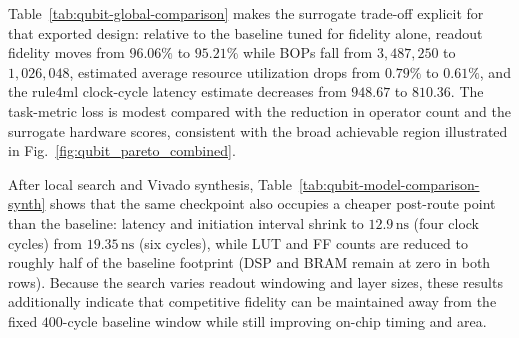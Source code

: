 \documentclass[11pt]{article}
\begin{document}
\begin{table}[t]
  \caption{Hardware resource utilization and latency estimates for qubit readout models synthesized with hls4ml.
  The baseline model uses a 400 clock cycle readout window with an 800-dimensional input.
  The SNAC-Pack model is synthesized after local search with iterative pruning and quantization-aware training.
  CC denotes the number of clock cycles.
  The best values are reported in bold.}
  \label{tab:qubit-model-comparison-synth}
  \centering
  \scriptsize
\end{table}

Table~\ref{tab:qubit-global-comparison} makes the surrogate trade-off explicit for that exported design: relative to the baseline tuned for fidelity alone, readout fidelity moves from $96.06\%$ to $95.21\%$ while BOPs fall from $3{,}487{,}250$ to $1{,}026{,}048$, estimated average resource utilization drops from $0.79\%$ to $0.61\%$, and the rule4ml clock-cycle latency estimate decreases from $948.67$ to $810.36$.
The task-metric loss is modest compared with the reduction in operator count and the surrogate hardware scores, consistent with the broad achievable region illustrated in Fig.~\ref{fig:qubit_pareto_combined}.

After local search and Vivado synthesis, Table~\ref{tab:qubit-model-comparison-synth} shows that the same checkpoint also occupies a cheaper post-route point than the baseline: latency and initiation interval shrink to $12.9\,\mathrm{ns}$ (four clock cycles) from $19.35\,\mathrm{ns}$ (six cycles), while LUT and FF counts are reduced to roughly half of the baseline footprint (DSP and BRAM remain at zero in both rows).
Because the search varies readout windowing and layer sizes, these results additionally indicate that competitive fidelity can be maintained away from the fixed $400$-cycle baseline window while still improving on-chip timing and area.
\end{document}
